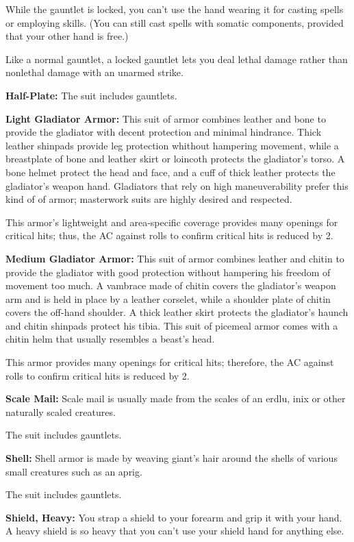 While the gauntlet is locked, you can't use the hand wearing it for casting spells or employing skills. (You can still cast spells with somatic components, provided that your other hand is free.)

Like a normal gauntlet, a locked gauntlet lets you deal lethal damage rather than nonlethal damage with an unarmed strike.

\textbf{Half-Plate:} The suit includes gauntlets.

\textbf{Light Gladiator Armor:} This suit of armor combines leather and bone to provide the gladiator with decent protection and minimal hindrance. Thick leather shinpads provide leg protection whithout hampering movement, while a breastplate of bone and leather skirt or loincoth protects the  gladiator's torso. A bone helmet protect the head and face, and a cuff of thick leather protects the gladiator's weapon hand. Gladiators that rely on high maneuverability prefer this kind of of armor; masterwork suits are highly desired and respected.

This armor's lightweight and area-specific coverage provides many openings for critical hits; thus, the AC against rolls to confirm critical hits is reduced by 2.

\textbf{Medium Gladiator Armor:} This suit of armor combines leather and chitin to provide the gladiator with good protection without hampering his freedom of movement too much. A vambrace made of chitin covers the gladiator's weapon arm and is held in place by a leather corselet, while a shoulder plate of chitin covers the off-hand shoulder. A thick leather skirt protects the gladiator's haunch and chitin shinpads protect his tibia. This suit of picemeal armor comes with a chitin helm that usually resembles a beast's head.

This armor provides many openings for critical hits; therefore, the AC against rolls to confirm critical hits is reduced by 2.

\textbf{Scale Mail:} Scale mail is usually made from the scales of an erdlu, inix or other naturally scaled creatures.

The suit includes gauntlets.

\textbf{Shell:} Shell armor is made by weaving giant's hair around the shells of various small creatures such as an aprig.

The suit includes gauntlets.

\textbf{Shield, Heavy:} You strap a shield to your forearm and grip it with your hand. A heavy shield is so heavy that you can't use your shield hand for anything else.

